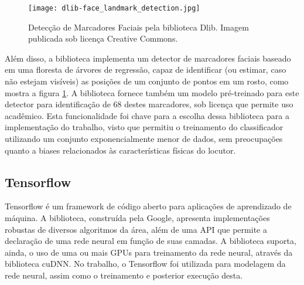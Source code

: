 
\begin{figure}[ht]
    \centering
    \texttt{[image: dlib-face\_landmark\_detection.jpg]}    
    \caption{Detecção de Marcadores Faciais pela biblioteca Dlib. Imagem publicada sob licença Creative Commons\cite{mtheilerDeteccaoMarcadoresFaciais2019}. }
    \label{fig:dlib-landmarking}
\end{figure}

Além disso, a biblioteca implementa um detector de marcadores faciais baseado em uma floresta de árvores de regressão, capaz de identificar (ou estimar, caso não estejam visíveis) as posições de um conjunto de pontos em um rosto, como mostra a figura \ref{fig:dlib-landmarking}. A biblioteca fornece também um modelo pré-treinado para este detector para identificação de 68 destes marcadores, sob licença que permite uso acadêmico. Esta funcionalidade foi chave para a escolha dessa biblioteca para a implementação do trabalho, visto que permitiu o treinamento do classificador utilizando um conjunto exponencialmente menor de dados, sem preocupações quanto a biases relacionados às características físicas do locutor.

\subsection{Tensorflow}
\label{subsec:tf}

Tensorflow\cite{tensorflow2015-whitepaper} é um framework de código aberto para aplicações de aprendizado de máquina. A biblioteca, construída pela Google, apresenta implementações robustas de diversos algoritmos da área, além de uma API que permite a declaração de uma rede neural em função de suas camadas. A biblioteca suporta, ainda, o uso de uma ou mais GPUs para treinamento da rede neural, através da biblioteca cuDNN. No trabalho, o Tensorflow foi utilizada para modelagem da rede neural, assim como o treinamento e posterior execução desta.

